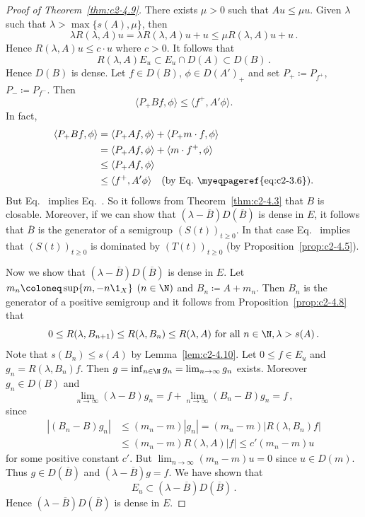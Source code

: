 \begin{proof}[Proof of Theorem~\ref{thm:c2-4.9}]  
There exists $\mu > 0$ such that $Au \leq \mu u$.
Given $\lambda$ such that  $\lambda > \max \{s(A),\mu\}$, 
then 
\[
\lambda R(\lambda,A)u = \lambda R(\lambda,A)u+u \leq \mu R(\lambda,A)u + u\,.
\]
Hence $R(\lambda,A)u \leq c \cdot u$ where $c > 0$.
It follows that 
\[
R(\lambda,A)E_{u} \subset E_{u} \cap D(A) \subset D(B)\,.
\]
Hence $D(B)$ is dense.
Let $f \in D(B)$, $\phi \in D(A')_{+}$ and set $P_{+} \coloneqq P_{f^{+}}$, $P_{-} \coloneqq P_{f^{-}}$.
Then
\begin{equation}\label{eq:c2-4.11}
\langle P_{+} Bf,\phi \rangle \leq \langle f^{+},A'\phi \rangle.
\end{equation}
In fact, 
\begin{align*}
\langle P_{+} Bf, \phi \rangle &= \langle P_{+} Af, \phi \rangle + \langle P_{+} m \cdot f, \phi \rangle\\
&= \langle P_{+} Af, \phi \rangle + \langle m \cdot f^{+}, \phi \rangle\\
&\leq \langle P_{+} Af, \phi \rangle\\
&\leq \langle f^{+}, A'\phi \rangle \quad \text{(by Eq.~\myeqpageref{eq:c2-3.6})}.
\end{align*}
But Eq.~ implies Eq.~.
So it follows from Theorem~\ref{thm:c2-4.3}   that $B$ is closable.
Moreover, if we can show that $(\lambda - \overline{B})D(\overline{B})$ is dense in $E$, it follows that $\overline{B}$ is the generator of a semigroup $(S(t))_{t \geq 0}$.
In that case Eq.~ implies that $(S(t))_{t \geq 0}$ is dominated by $(T(t))_{t \geq 0}$ 
(by Proposition~\ref{prop:c2-4.5}).

Now we show that $(\lambda - \overline{B})D(\overline{B})$ is dense in $E$.
Let $m_{n} \coloneq \sup \{m, -n \1_{X}\}$ $(n \in \N )$ and $B_{n} \coloneq A + m_{n}$.
Then $B_{n}$ is the generator of a positive semigroup and it follows from Proposition~\ref{prop:c2-4.8}  that 
\[
0 \leq R(\lambda,B_{n+1}) \leq R(\lambda,B_{n}) \leq R(\lambda,A) \text{ for all } n \in \N , \lambda > s(A)\,.
\]
Note that $s(B_{n}) \leq s(A)$ by Lemma~\ref{lem:c2-4.10}.
Let $0 \leq f \in E_{u}$ and $g_{n} = R(\lambda,B_{n})f$.
Then $g = \inf_{n \in \N } g_{n} = \lim_{n \to \infty} g_{n}$ exists.
Moreover $g_{n} \in D(B)$ and 
\[
\lim_{n \to \infty} (\lambda - B)g_{n} = f + \lim_{n \to \infty} (B_{n} - B)g_{n} = f\,,
\]
since
\begin{equation*}
    \begin{split}
        |(B_{n} - B)g_{n}| &\leq (m_{n} - m)|g_{n}| = (m_{n} - m)|R(\lambda,B_{n})f| \\
        &\leq (m_{n} - m)R(\lambda,A)|f| \leq c' (m_{n} - m)u
    \end{split}
\end{equation*}
for some positive constant $c'$.
But $\lim_{n \to \infty} (m_{n} - m)u = 0$ since $u \in D(m)$.
Thus $g \in D(\overline{B})$ and $(\lambda - \overline{B})g = f$.
We have shown that 
\[
E_{u} \subset (\lambda - \overline{B})D(\overline{B})\,.
\]
Hence $(\lambda - \overline{B})D(\overline{B})$ is dense in $E$.
\end{proof}
